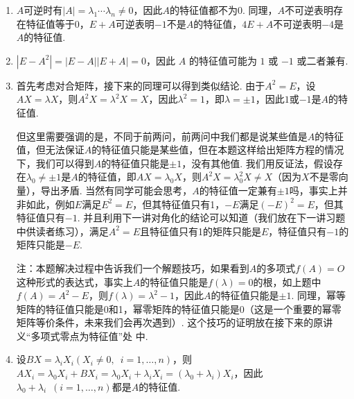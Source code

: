 \documentclass[12pt,fontset=fandol]{ctexart}
\begin{document}
\begin{solve}
\begin{enumerate}
        \item $A$可逆时有$|A|=\lambda_1\cdots\lambda_n\neq 0$，因此$A$的特征值都不为0. 同理，$A$不可逆表明存在特征值等于0，$E+A$可逆表明$-1$不是$A$的特征值，$4E+A$不可逆表明$-4$是$A$的特征值.

        \item $|E - A^2| = |E - A||E + A| = 0$，因此 $A$ 的特征值可能为 $1$ 或 $-1$ 或二者兼有.

        \item 首先考虑对合矩阵，接下来的同理可以得到类似结论. 由于$A^2=E$，设$AX=\lambda X$，则$A^2X=\lambda^2X=X$，因此$\lambda^2=1$，即$\lambda=\pm 1$，因此$1$或$-1$是$A$的特征值.

              但这里需要强调的是，不同于前两问，前两问中我们都是说某些值是$A$的特征值，但无法保证$A$的特征值只能是某些值，但在本题这样给出矩阵方程的情况下，我们可以得到$A$的特征值只能是$\pm 1$，没有其他值. 我们用反证法，假设存在$\lambda_0\neq\pm 1$是$A$的特征值，即$AX=\lambda_0X$，则$A^2X=\lambda_0^2X\neq X$（因为$X$不是零向量），导出矛盾. 当然有同学可能会思考，$A$的特征值一定兼有$\pm 1$吗，事实上并非如此，例如$E$满足$E^2=E$，但其特征值只有1，$-E$满足$(-E)^2=E$，但其特征值只有$-1$. 并且利用下一讲对角化的结论可以知道（我们放在下一讲习题中供读者练习），满足$A^2=E$且特征值只有1的矩阵只能是$E$，特征值只有$-1$的矩阵只能是$-E$.

              注：本题解决过程中告诉我们一个解题技巧，如果看到$A$的多项式$f(A)=O$这种形式的表达式，事实上$A$的特征值只能是$f(\lambda)=0$的根，如上题中$f(A)=A^2-E$，则$f(\lambda)=\lambda^2-1$，因此$A$的特征值只能是$\pm 1$. 同理，幂等矩阵的特征值只能是0和1，幂零矩阵的特征值只能是0（这是一个重要的幂零矩阵等价条件，未来我们会再次遇到）. 这个技巧的证明放在接下来的原讲义“多项式零点为特征值”处 中.

        \item 设$BX=\lambda_iX_i(X_i\neq 0,\enspace i=1,\ldots,n)$，则$AX_i=\lambda_0X_i+BX_i=\lambda_0X_i+\lambda_iX_i=(\lambda_0+\lambda_i)X_i$，因此$\lambda_0+\lambda_i\enspace(i=1,\ldots,n)$都是$A$的特征值.


\end{enumerate}
\end{solve}
\end{document}
